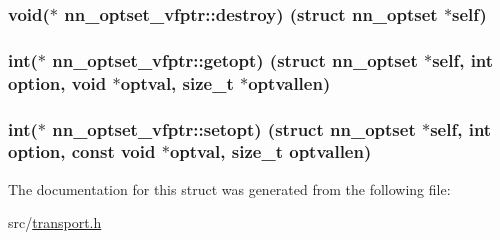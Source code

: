 \subsubsection[{destroy}]{\setlength{\rightskip}{0pt plus 5cm}void($\ast$ nn\+\_\+optset\+\_\+vfptr\+::destroy) (struct {\bf nn\+\_\+optset} $\ast$self)}\hypertarget{structnn__optset__vfptr_a74db5716dbfea0adbf69448f26804cc0}{}\label{structnn__optset__vfptr_a74db5716dbfea0adbf69448f26804cc0}
\subsubsection[{getopt}]{\setlength{\rightskip}{0pt plus 5cm}int($\ast$ nn\+\_\+optset\+\_\+vfptr\+::getopt) (struct {\bf nn\+\_\+optset} $\ast$self, int option, void $\ast$optval, size\+\_\+t $\ast$optvallen)}\hypertarget{structnn__optset__vfptr_a1e222a6d339ed4c930ab046bb61d77a0}{}\label{structnn__optset__vfptr_a1e222a6d339ed4c930ab046bb61d77a0}
\subsubsection[{setopt}]{\setlength{\rightskip}{0pt plus 5cm}int($\ast$ nn\+\_\+optset\+\_\+vfptr\+::setopt) (struct {\bf nn\+\_\+optset} $\ast$self, int option, const void $\ast$optval, size\+\_\+t optvallen)}\hypertarget{structnn__optset__vfptr_a5a978c6140bb775abc02fcdf9456b60a}{}\label{structnn__optset__vfptr_a5a978c6140bb775abc02fcdf9456b60a}


The documentation for this struct was generated from the following file\+:\begin{DoxyCompactItemize}
\item 
src/\hyperlink{transport_8h}{transport.\+h}\end{DoxyCompactItemize}
